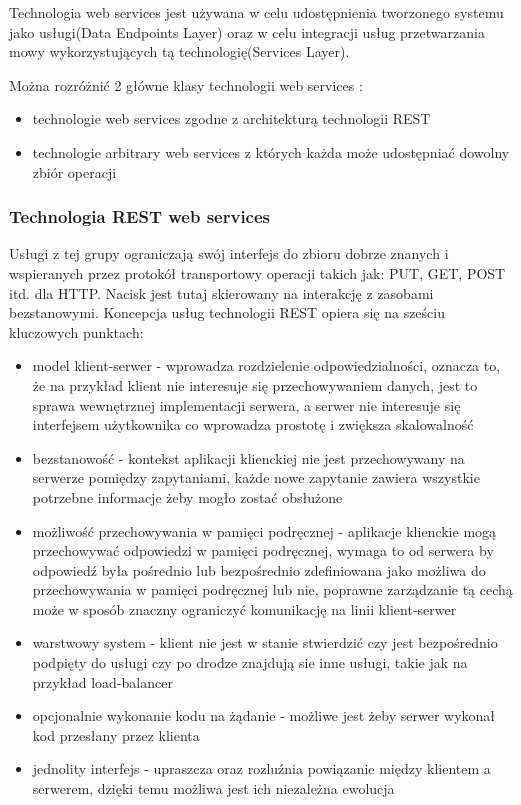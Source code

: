 Technologia web services jest używana w celu udostępnienia tworzonego systemu jako usługi(Data Endpoints Layer) oraz w celu integracji usług przetwarzania mowy wykorzystujących tą technologię(Services Layer).

Można rozróżnić 2 główne klasy technologii web services :
\begin{itemize}
	\item technologie web services zgodne z architekturą technologii REST
	\item technologie arbitrary web services z których każda może udostępniać dowolny zbiór operacji
\end{itemize}  
\subsubsection{Technologia REST web services}
Usługi z tej grupy \cite{fielding2000} ograniczają swój interfejs do zbioru dobrze znanych i wspieranych przez protokół transportowy operacji takich jak: PUT, GET, POST itd. dla  HTTP. Nacisk jest tutaj skierowany na interakcję z zasobami bezstanowymi. Koncepcja usług technologii REST opiera się na sześciu kluczowych punktach:
\begin{itemize}
	\item model klient-serwer - wprowadza rozdzielenie odpowiedzialności, oznacza to, że na przykład klient nie interesuje się przechowywaniem danych, jest to sprawa wewnętrznej implementacji serwera, a serwer nie interesuje się interfejsem użytkownika co wprowadza prostotę i zwiększa skalowalność
	\item bezstanowość - kontekst aplikacji klienckiej nie jest przechowywany na serwerze pomiędzy zapytaniami, każde nowe zapytanie zawiera wszystkie potrzebne informacje żeby mogło zostać obsłużone
	\item możliwość przechowywania w pamięci podręcznej - aplikacje klienckie mogą przechowywać odpowiedzi w pamięci podręcznej, wymaga to od serwera by odpowiedź była pośrednio lub bezpośrednio zdefiniowana jako możliwa do przechowywania w pamięci podręcznej lub nie, poprawne zarządzanie tą cechą może w sposób znaczny ograniczyć komunikację na linii klient-serwer
	\item warstwowy system - klient nie jest w stanie stwierdzić czy jest bezpośrednio podpięty do usługi czy po drodze znajdują sie inne usługi, takie jak na przykład load-balancer
	\item opcjonalnie wykonanie kodu na żądanie - możliwe jest żeby serwer wykonał kod przesłany przez klienta
	\item jednolity interfejs - upraszcza oraz rozluźnia powiązanie między klientem a serwerem, dzięki temu możliwa jest ich niezależna ewolucja
\end{itemize}   
